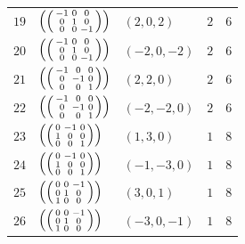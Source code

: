 \documentclass[11pt,a4paper]{article}
\theoremstyle{definition}
\begin{document}
\begin{longtable}{p{1.2cm}p{3.0cm}p{2.6cm}cc}
$19$ & $\left(\begin{psmallmatrix} -1 & 0 & 0 \\ 0 & 1 & 0 \\ 0 & 0 & -1 \end{psmallmatrix}\right)$ & $(2, 0, 2)$ & $2$ & $6$ \\
$20$ & $\left(\begin{psmallmatrix} -1 & 0 & 0 \\ 0 & 1 & 0 \\ 0 & 0 & -1 \end{psmallmatrix}\right)$ & $(-2, 0, -2)$ & $2$ & $6$ \\
$21$ & $\left(\begin{psmallmatrix} -1 & 0 & 0 \\ 0 & -1 & 0 \\ 0 & 0 & 1 \end{psmallmatrix}\right)$ & $(2, 2, 0)$ & $2$ & $6$ \\
$22$ & $\left(\begin{psmallmatrix} -1 & 0 & 0 \\ 0 & -1 & 0 \\ 0 & 0 & 1 \end{psmallmatrix}\right)$ & $(-2, -2, 0)$ & $2$ & $6$ \\
$23$ & $\left(\begin{psmallmatrix} 0 & -1 & 0 \\ 1 & 0 & 0 \\ 0 & 0 & 1 \end{psmallmatrix}\right)$ & $(1, 3, 0)$ & $1$ & $8$ \\
$24$ & $\left(\begin{psmallmatrix} 0 & -1 & 0 \\ 1 & 0 & 0 \\ 0 & 0 & 1 \end{psmallmatrix}\right)$ & $(-1, -3, 0)$ & $1$ & $8$ \\
$25$ & $\left(\begin{psmallmatrix} 0 & 0 & -1 \\ 0 & 1 & 0 \\ 1 & 0 & 0 \end{psmallmatrix}\right)$ & $(3, 0, 1)$ & $1$ & $8$ \\
$26$ & $\left(\begin{psmallmatrix} 0 & 0 & -1 \\ 0 & 1 & 0 \\ 1 & 0 & 0 \end{psmallmatrix}\right)$ & $(-3, 0, -1)$ & $1$ & $8$ \\

\end{longtable}
\end{document}
